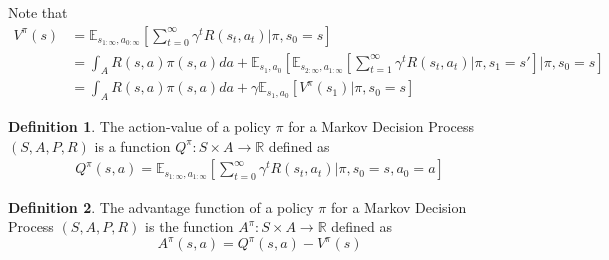 \documentclass[11pt]{article}
\theoremstyle{definition}
\newtheorem{definition}{Definition}[section]
\begin{document}
Note that
\begin{equation}
\begin{split}
V^{\pi}(s) &= \mathbb{E}_{s_{1:\infty},a_{0:\infty}} \left[ \sum_{t=0}^{\infty} \gamma^t R(s_t, a_t) | \pi, s_0 = s \right] \\
&= \int_A R(s,a) \pi (s,a) da + \mathbb{E}_{s_1,a_0} \left[ \mathbb{E}_{s_{2:\infty},a_{1:\infty}} \left[ \sum_{t=1}^{\infty} \gamma^t R(s_t, a_t) | \pi, s_1 = s' \right] | \pi, s_0 = s \right] \\
&= \int_A R(s,a) \pi (s,a) da + \gamma \mathbb{E}_{s_1,a_0} \left[ V^{\pi}(s_1) | \pi, s_0 = s \right]
\end{split}
\end{equation}

\begin{definition}
The action-value of a policy $\pi$ for a Markov Decision Process $(S,A,P,R)$ is a function $Q^{\pi} : S \times A \rightarrow \mathbb{R}$ defined as
\begin{equation}
\begin{split}
Q^{\pi} (s,a) = \mathbb{E}_{s_{1:\infty},a_{1:\infty}} \left[ \sum_{t=0}^{\infty} \gamma^t R(s_t, a_t) | \pi, s_0 = s, a_0 = a \right]
\end{split}
\end{equation}
\end{definition}

\begin{definition}
The advantage function of a policy $\pi$ for a Markov Decision Process $(S,A,P,R)$ is the function $A^{\pi} : S \times A \rightarrow \mathbb{R}$ defined as
\begin{equation}
A^{\pi} (s,a) = Q^{\pi} (s,a) - V^{\pi} (s)
\end{equation}
\end{definition}
\end{document}

